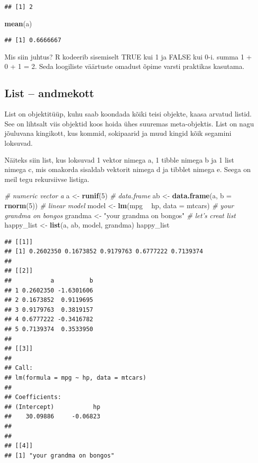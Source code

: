 \documentclass[]{book}
\newenvironment{Shaded}{\begin{snugshade}}{\end{snugshade}}
\newcommand{\KeywordTok}[1]{\textcolor[rgb]{0.13,0.29,0.53}{\textbf{#1}}}
\newcommand{\DataTypeTok}[1]{\textcolor[rgb]{0.13,0.29,0.53}{#1}}
\newcommand{\DecValTok}[1]{\textcolor[rgb]{0.00,0.00,0.81}{#1}}
\newcommand{\StringTok}[1]{\textcolor[rgb]{0.31,0.60,0.02}{#1}}
\newcommand{\CommentTok}[1]{\textcolor[rgb]{0.56,0.35,0.01}{\textit{#1}}}
\newcommand{\OperatorTok}[1]{\textcolor[rgb]{0.81,0.36,0.00}{\textbf{#1}}}
\newcommand{\NormalTok}[1]{#1}
\begin{document}
\begin{verbatim}
## [1] 2
\end{verbatim}

\begin{Shaded}
\begin{Highlighting}[]
\KeywordTok{mean}\NormalTok{(a)}
\end{Highlighting}
\end{Shaded}

\begin{verbatim}
## [1] 0.6666667
\end{verbatim}

Mis siin juhtus? R kodeerib sisemiselt TRUE kui 1 ja FALSE kui 0-i.
summa 1 + 0 + 1 = 2. Seda loogiliste väärtuste omadust õpime varsti
praktikas kasutama.

\subsection{List -- andmekott}\label{list-andmekott}

List on objektitüüp, kuhu saab koondada kõiki teisi objekte, kaasa
arvatud listid. See on lihtsalt viis objektid koos hoida ühes suuremas
meta-objektis. List on nagu jõuluvana kingikott, kus kommid, sokipaarid
ja muud kingid kõik segamini loksuvad.

Näiteks siin list, kus loksuvad 1 vektor nimega a, 1 tibble nimega b ja
1 list nimega c, mis omakorda sisaldab vektorit nimega d ja tibblet
nimega e. Seega on meil tegu rekursiivse listiga.

\begin{Shaded}
\begin{Highlighting}[]
\CommentTok{# numeric vector a}
\NormalTok{a <-}\StringTok{ }\KeywordTok{runif}\NormalTok{(}\DecValTok{5}\NormalTok{)}
\CommentTok{# data.frame}
\NormalTok{ab <-}\StringTok{ }\KeywordTok{data.frame}\NormalTok{(a, }\DataTypeTok{b =} \KeywordTok{rnorm}\NormalTok{(}\DecValTok{5}\NormalTok{))}
\CommentTok{# linear model}
\NormalTok{model <-}\StringTok{ }\KeywordTok{lm}\NormalTok{(mpg }\OperatorTok{~}\StringTok{ }\NormalTok{hp, }\DataTypeTok{data =}\NormalTok{ mtcars)}
\CommentTok{# your grandma on bongos}
\NormalTok{grandma <-}\StringTok{ "your grandma on bongos"}
\CommentTok{# let's creat list}
\NormalTok{happy_list <-}\StringTok{ }\KeywordTok{list}\NormalTok{(a, ab, model, grandma)}
\NormalTok{happy_list}
\end{Highlighting}
\end{Shaded}

\begin{verbatim}
## [[1]]
## [1] 0.2602350 0.1673852 0.9179763 0.6777222 0.7139374
## 
## [[2]]
##           a          b
## 1 0.2602350 -1.6301606
## 2 0.1673852  0.9119695
## 3 0.9179763  0.3819157
## 4 0.6777222 -0.3416782
## 5 0.7139374  0.3533950
## 
## [[3]]
## 
## Call:
## lm(formula = mpg ~ hp, data = mtcars)
## 
## Coefficients:
## (Intercept)           hp  
##    30.09886     -0.06823  
## 
## 
## [[4]]
## [1] "your grandma on bongos"
\end{verbatim}
\end{document}
